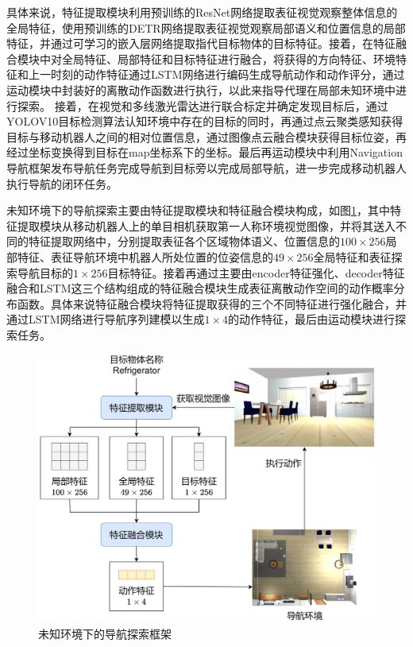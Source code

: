 具体来说，特征提取模块利用预训练的ResNet网络提取表征视觉观察整体信息的全局特征，使用预训练的DETR网络提取表征视觉观察局部语义和位置信息的局部特征，并通过可学习的嵌入层网络提取指代目标物体的目标特征。接着，在特征融合模块中对全局特征、局部特征和目标特征进行融合，将获得的方向特征、环境特征和上一时刻的动作特征通过LSTM网络进行编码生成导航动作和动作评分，通过运动模块中封装好的离散动作函数进行执行，以此来指导代理在局部未知环境中进行探索。
接着，在视觉和多线激光雷达进行联合标定并确定发现目标后，通过YOLOV10目标检测算法认知环境中存在的目标的同时，再通过点云聚类感知获得目标与移动机器人之间的相对位置信息，通过图像点云融合模块获得目标位姿，再经过坐标变换得到目标在map坐标系下的坐标。最后再运动模块中利用Navigation导航框架发布导航任务完成导航到目标旁以完成局部导航，进一步完成移动机器人执行导航的闭环任务。

未知环境下的导航探索主要由特征提取模块和特征融合模块构成，如图\ref{提取-融合框架}，其中特征提取模块从移动机器人上的单目相机获取第一人称环境视觉图像，并将其送入不同的特征提取网络中，分别提取表征各个区域物体语义、位置信息的$100 \times 256$局部特征、表征导航环境中机器人所处位置的位姿信息的$49 \times 256$全局特征和表征探索导航目标的$1 \times 256$目标特征。接着再通过主要由encoder特征强化、decoder特征融合和LSTM这三个结构组成的特征融合模块生成表征离散动作空间的动作概率分布函数。具体来说特征融合模块将特征提取获得的三个不同特征进行强化融合，并通过LSTM网络进行导航序列建模以生成$1 \times 4$的动作特征，最后由运动模块进行探索任务。
\begin{figure}[htbp]
    \centering
    \includegraphics[scale=0.11]{Fig/提取-融合框架.png}
    \caption{\label{提取-融合框架}未知环境下的导航探索框架}
\end{figure}

